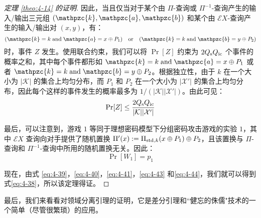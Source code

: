 \begin{proof}[定理 \ref{theo:4-14} 的证明]
因此，当且仅当对于某个由 $\Pi$-查询或 $\Pi^{-1}$-查询产生的输入/输出三元组 $(\mathpzc{k},\mathpzc{a},\mathpzc{b})$ 和某个由 $\mathcal{E}X$-查询产生的输入/输出对 $(x,y)$，有：
\begin{equation}
(\mathpzc{k}=k\;{\rm and}\;\mathpzc{a}=x\oplus P_1)
\quad\text{or}\quad
(\mathpzc{k}=k\;{\rm and}\;\mathpzc{b}=y\oplus P_2)
\end{equation}
时，事件 $Z$ 发生。使用联合约束，我们可以将 $\Pr[Z]$ 约束为 $2Q_{\rm s}Q_{\rm ic}$ 个事件的概率之和，其中每个事件都形如 $\mathpzc{k}=k\;\text{and}\;\mathpzc{a}=x\oplus P_1$ 或者 $\mathpzc{k}=k\;\text{and}\;\mathpzc{b}=y\oplus P_2$。根据独立性，由于 $k$ 在一个大小为 $|\mathcal{K}|$ 的集合上均匀分布，而 $P_1$ 和 $P_2$ 在一个大小为 $|\mathcal{X}'|$ 的集合上均匀分布，因此每个这样的事件发生的概率最多为 ${1}/{(|\mathcal{K}||\mathcal{X}'|)}$。由此可见：
\begin{equation}\label{eq:4-43}
\Pr[Z]\leq\frac{2Q_{\rm s}Q_{\rm ic}}{|\mathcal{K}||\mathcal{X}'|}
\end{equation}

最后，可以注意到，游戏 $1$ 等同于理想密码模型下分组密码攻击游戏的实验 $1$，其中 $\mathcal{E}X$ 查询向对手提供了随机置换 $\Pi'(x):=\Pi_{{\rm std},k}(x\oplus P_1) \oplus P_2$，且该置换与 $\Pi$-查询和 $\Pi^{-1}$-查询中所用的随机置换无关。因此：
\begin{equation}\label{eq:4-44}
\Pr[W_1]=p_1
\end{equation}

现在，由式 \ref{eq:4-39}，\ref{eq:4-40}，\ref{eq:4-41}，\ref{eq:4-43} 和\ref{eq:4-44}，我们就可以得到式\ref{eq:4-38}，所以该定理得证。
\end{proof}


最后，我们来看看对领域分离引理的证明，它是差分引理和``健忘的侏儒"技术的一个简单（尽管很繁琐）的应用。

